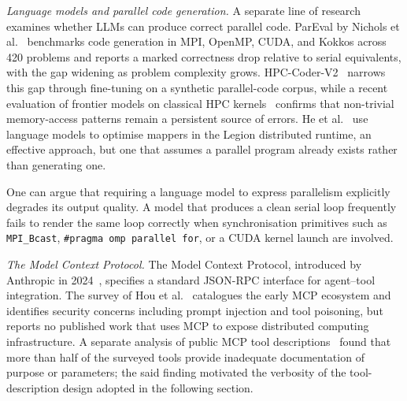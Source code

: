 \textit{Language models and parallel code generation.}\quad
A separate line of research examines whether LLMs can produce correct parallel code. ParEval by Nichols et al.~\cite{nichols2024pareval} benchmarks code generation in MPI, OpenMP, CUDA, and Kokkos across 420 problems and reports a marked correctness drop relative to serial equivalents, with the gap widening as problem complexity grows. HPC-Coder-V2~\cite{nichols2024hpccoderv2} narrows this gap through fine-tuning on a synthetic parallel-code corpus, while a recent evaluation of frontier models on classical HPC kernels~\cite{xu2025llmhpc} confirms that non-trivial memory-access patterns remain a persistent source of errors. He et al.~\cite{he2025legion} use language models to optimise mappers in the Legion distributed runtime, an effective approach, but one that assumes a parallel program already exists rather than generating one.

One can argue that requiring a language model to express parallelism explicitly degrades its output quality. A model that produces a clean serial loop frequently fails to render the same loop correctly when synchronisation primitives such as \texttt{MPI\_Bcast}, \texttt{\#pragma omp parallel for}, or a CUDA kernel launch are involved.

\textit{The Model Context Protocol.}\quad
The Model Context Protocol, introduced by Anthropic in 2024~\cite{anthropic2024mcp}, specifies a standard JSON-RPC interface for agent--tool integration. The survey of Hou et al.~\cite{hou2025mcp} catalogues the early MCP ecosystem and identifies security concerns including prompt injection and tool poisoning, but reports no published work that uses MCP to expose distributed computing infrastructure. A separate analysis of public MCP tool descriptions~\cite{luo2025mcpsmelly} found that more than half of the surveyed tools provide inadequate documentation of purpose or parameters; the said finding motivated the verbosity of the tool-description design adopted in the following section.

